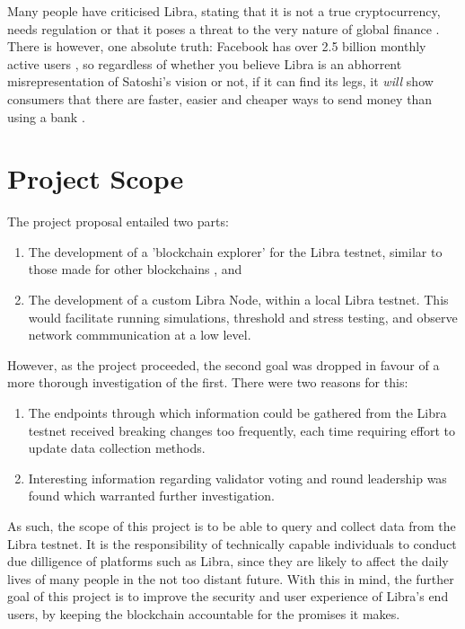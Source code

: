 \documentclass[12pt,openany,a4paper]{book}
\begin{document}
Many people have criticised Libra, stating that it is not a true cryptocurrency, needs regulation \cite{rirsh_tomanek} or that 
it poses a threat to the very nature of global finance \cite{petrou_20}. 
There is however, one absolute truth: Facebook has over 2.5 billion monthly active users \cite{facebook_stats}, so
regardless of whether you believe Libra is an abhorrent
misrepresentation of Satoshi's vision or not, if it can find its legs, it \textit{will} 
show consumers that there 
are faster, easier and cheaper ways to send money than using a bank \cite{taskinsoy}.

\section{Project Scope}
The project proposal entailed two parts: 
\begin{enumerate}
    \item The development of a 'blockchain explorer' for the Libra testnet, similar to those made 
    for other blockchains \cite{etherscan, blockchain_dotcom}, and
    \item The development of a custom Libra Node, within a local Libra testnet. This would facilitate 
    running simulations, threshold and stress testing, and observe network commmunication at a low level.
\end{enumerate}

However, as the project proceeded, the second goal was dropped in favour of 
a more thorough investigation of the first. There were two reasons for this:
\begin{enumerate}
    \item The endpoints through which information could be gathered from the Libra testnet 
    received breaking changes too frequently, each time requiring effort to update 
    data collection methods.
    \item Interesting information regarding validator voting and round leadership 
    was found which warranted further investigation.
\end{enumerate}

As such, the scope of this project is to be able to query and collect data from the Libra testnet.
It is the responsibility of technically capable individuals to conduct due 
dilligence of platforms such as Libra, since they are likely to affect the daily lives 
of many people in the not too distant future. With this in mind, the further goal of this 
project is to improve the security and user experience of Libra's end users, by 
keeping the blockchain accountable for the promises it makes.
\end{document}
